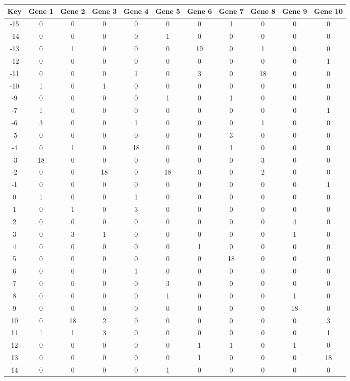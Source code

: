 \begin{tabular}{|c|c|c|c|c|c|c|c|c|c|c|}
\hline
Key & Gene 1 & Gene 2 & Gene 3 & Gene 4 & Gene 5 & Gene 6 & Gene 7 & Gene 8 & Gene 9 & Gene 10 \\
\hline
-15 & 0 & 0 & 0 & 0 & 0 & 0 & 1 & 0 & 0 & 0 \\
-14 & 0 & 0 & 0 & 0 & 1 & 0 & 0 & 0 & 0 & 0 \\
-13 & 0 & 1 & 0 & 0 & 0 & 19 & 0 & 1 & 0 & 0 \\
-12 & 0 & 0 & 0 & 0 & 0 & 0 & 0 & 0 & 0 & 1 \\
-11 & 0 & 0 & 0 & 1 & 0 & 3 & 0 & 18 & 0 & 0 \\
-10 & 1 & 0 & 1 & 0 & 0 & 0 & 0 & 0 & 0 & 0 \\
-9 & 0 & 0 & 0 & 0 & 1 & 0 & 1 & 0 & 0 & 0 \\
-7 & 1 & 0 & 0 & 0 & 0 & 0 & 0 & 0 & 0 & 1 \\
-6 & 3 & 0 & 0 & 1 & 0 & 0 & 0 & 1 & 0 & 0 \\
-5 & 0 & 0 & 0 & 0 & 0 & 0 & 3 & 0 & 0 & 0 \\
-4 & 0 & 1 & 0 & 18 & 0 & 0 & 1 & 0 & 0 & 0 \\
-3 & 18 & 0 & 0 & 0 & 0 & 0 & 0 & 3 & 0 & 0 \\
-2 & 0 & 0 & 18 & 0 & 18 & 0 & 0 & 2 & 0 & 0 \\
-1 & 0 & 0 & 0 & 0 & 0 & 0 & 0 & 0 & 0 & 1 \\
0 & 1 & 0 & 0 & 1 & 0 & 0 & 0 & 0 & 0 & 0 \\
1 & 0 & 1 & 0 & 3 & 0 & 0 & 0 & 0 & 0 & 0 \\
2 & 0 & 0 & 0 & 0 & 0 & 0 & 0 & 0 & 4 & 0 \\
3 & 0 & 3 & 1 & 0 & 0 & 0 & 0 & 0 & 1 & 0 \\
4 & 0 & 0 & 0 & 0 & 0 & 1 & 0 & 0 & 0 & 0 \\
5 & 0 & 0 & 0 & 0 & 0 & 0 & 18 & 0 & 0 & 0 \\
6 & 0 & 0 & 0 & 1 & 0 & 0 & 0 & 0 & 0 & 0 \\
7 & 0 & 0 & 0 & 0 & 3 & 0 & 0 & 0 & 0 & 0 \\
8 & 0 & 0 & 0 & 0 & 1 & 0 & 0 & 0 & 1 & 0 \\
9 & 0 & 0 & 0 & 0 & 0 & 0 & 0 & 0 & 18 & 0 \\
10 & 0 & 18 & 2 & 0 & 0 & 0 & 0 & 0 & 0 & 3 \\
11 & 1 & 1 & 3 & 0 & 0 & 0 & 0 & 0 & 0 & 1 \\
12 & 0 & 0 & 0 & 0 & 0 & 1 & 1 & 0 & 1 & 0 \\
13 & 0 & 0 & 0 & 0 & 0 & 1 & 0 & 0 & 0 & 18 \\
14 & 0 & 0 & 0 & 0 & 1 & 0 & 0 & 0 & 0 & 0 \\
\hline
\end{tabular}